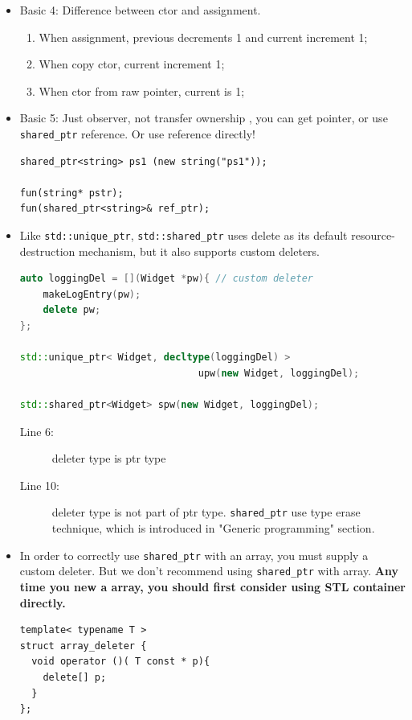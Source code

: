 \documentclass[a4paper,11pt,twoside]{book}
\begin{document}
\begin{itemize}
\item Basic 4: Difference between ctor and assignment.
\begin{enumerate}
\item When assignment, previous decrements 1 and current increment 1;
\item When copy ctor, current increment 1;
\item When ctor from raw pointer, current is 1;
\end{enumerate}

\item Basic 5: Just observer, not transfer ownership , you can get pointer, or use \texttt{shared\_ptr} reference. Or use reference directly!
\begin{lstlisting}[numbers = none]
shared_ptr<string> ps1 (new string("ps1"));

fun(string* pstr);
fun(shared_ptr<string>& ref_ptr);
\end{lstlisting}


\item Like \texttt{std::unique\_ptr}, \texttt{std::shared\_ptr} uses delete as its default resource-destruction mechanism, but it also supports custom deleters.
\begin{lstlisting}[frame=single, language=c++]
auto loggingDel = [](Widget *pw){ // custom deleter
	makeLogEntry(pw);
	delete pw;
};

std::unique_ptr< Widget, decltype(loggingDel) >
                               upw(new Widget, loggingDel);

std::shared_ptr<Widget> spw(new Widget, loggingDel);
\end{lstlisting}
\begin{description}
	\item[Line 6:] deleter type is ptr type
	\item[Line 10:] deleter type is not part of ptr type. \texttt{shared\_ptr} use type erase technique, which is introduced in "Generic programming" section. 
\end{description}

\item In order to correctly use \texttt{shared\_ptr} with an array, you must supply a custom deleter. But we don't recommend using \texttt{shared\_ptr} with array. \textbf{Any time you new a array, you should first consider using STL container directly.}
\begin{lstlisting}[numbers=none]
template< typename T >
struct array_deleter {
  void operator ()( T const * p){
    delete[] p;
  }
};


\end{lstlisting}
\end{itemize}
\end{document}
